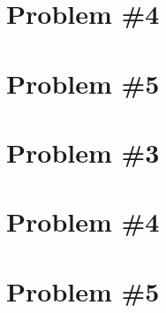 \documentclass{article}
\begin{document}
\section*{Problem \#4}


\section*{Problem \#5}




\section*{Problem \#3}


\section*{Problem \#4}


\section*{Problem \#5}
\end{document}
